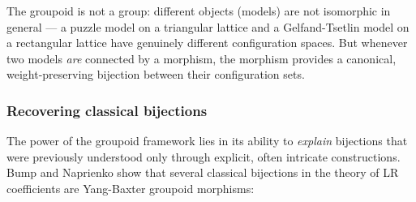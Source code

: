 \begin{remark}
The groupoid is not a group: different objects (models) are not
isomorphic in general --- a puzzle model on a triangular lattice and
a Gelfand-Tsetlin model on a rectangular lattice have genuinely
different configuration spaces.  But whenever two models \emph{are}
connected by a morphism, the morphism provides a canonical,
weight-preserving bijection between their configuration sets.
\end{remark}

\subsubsection*{Recovering classical bijections}

The power of the groupoid framework lies in its ability to
\emph{explain} bijections that were previously understood only through
explicit, often intricate constructions.  Bump and Naprienko show that
several classical bijections in the theory of LR coefficients are
Yang-Baxter groupoid morphisms:


